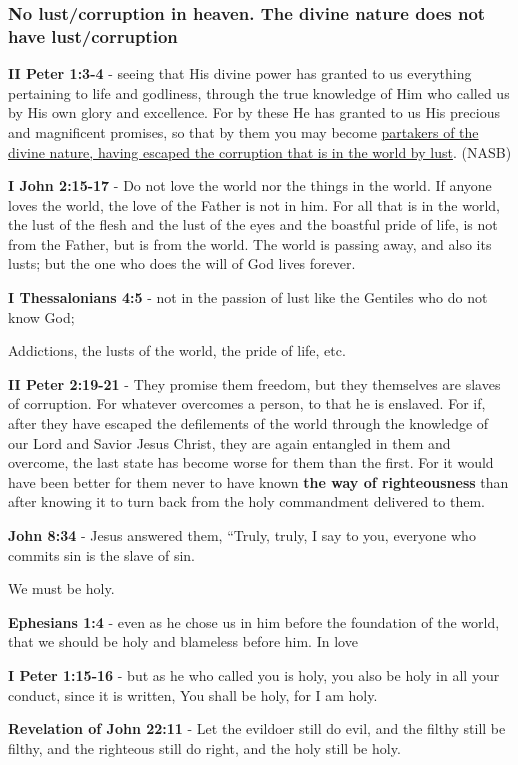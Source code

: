 \documentclass[11pt]{article}
\begin{document}
\subsubsection{No lust/corruption in heaven. The divine nature does not have lust/corruption}
\label{sec:org8b51ec5}
\textbf{II Peter 1:3-4} - seeing that His divine power has granted to us everything pertaining to life and godliness, through the true knowledge of Him who called us by His own glory and excellence. For by these He has granted to us His precious and magnificent promises, so that by them you may become \uline{partakers of the divine nature, having escaped the corruption that is in the world by lust}. (NASB)

\textbf{I John 2:15-17} - Do not love the world nor the things in the world. If anyone loves the world, the love of the Father is not in him. For all that is in the world, the lust of the flesh and the lust of the eyes and the boastful pride of life, is not from the Father, but is from the world. The world is passing away, and also its lusts; but the one who does the will of God lives forever.

\textbf{I Thessalonians 4:5} - not in the passion of lust like the Gentiles who do not know God;

Addictions, the lusts of the world, the pride of life, etc.

\textbf{II Peter 2:19-21} - They promise them freedom, but they themselves are slaves of corruption. For whatever overcomes a person, to that he is enslaved. For if, after they have escaped the defilements of the world through the knowledge of our Lord and Savior Jesus Christ, they are again entangled in them and overcome, the last state has become worse for them than the first. For it would have been better for them never to have known \textbf{the way of righteousness} than after knowing it to turn back from the holy commandment delivered to them.

\textbf{John 8:34} - Jesus answered them, “Truly, truly, I say to you, everyone who commits sin is the slave of sin.

We must be holy.

\textbf{Ephesians 1:4} - even as he chose us in him before the foundation of the world, that we should be holy and blameless before him. In love

\textbf{I Peter 1:15-16} - but as he who called you is holy, you also be holy in all your conduct, since it is written, You shall be holy, for I am holy.

\textbf{Revelation of John 22:11} - Let the evildoer still do evil, and the filthy still be filthy, and the righteous still do right, and the holy still be holy.
\end{document}
